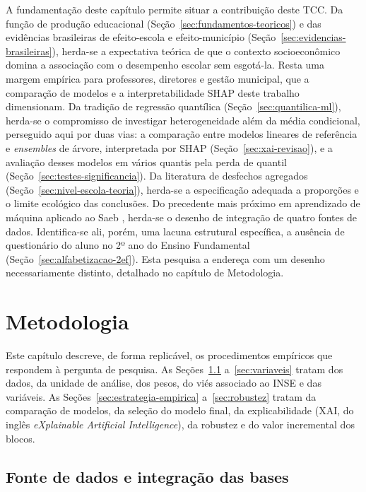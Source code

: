 A fundamentação deste capítulo permite situar a contribuição deste TCC. Da função de produção educacional
(Seção~\ref{sec:fundamentos-teoricos}) e das evidências brasileiras de
efeito-escola e efeito-município (Seção~\ref{sec:evidencias-brasileiras}),
herda-se a expectativa teórica de que o contexto socioeconômico domina a
associação com o desempenho escolar sem esgotá-la. Resta uma margem
empírica para professores, diretores e gestão municipal, que a comparação
de modelos e a interpretabilidade SHAP deste trabalho dimensionam. Da tradição de regressão quantílica
(Seção~\ref{sec:quantilica-ml}), herda-se o compromisso de investigar
heterogeneidade além da média condicional, perseguido aqui por duas vias:
a comparação entre modelos lineares de referência e \textit{ensembles} de
árvore, interpretada por SHAP (Seção~\ref{sec:xai-revisao}), e a avaliação
desses modelos em vários quantis pela perda de quantil
(Seção~\ref{sec:testes-significancia}). Da literatura de desfechos
agregados (Seção~\ref{sec:nivel-escola-teoria}), herda-se a especificação
adequada a proporções e o limite ecológico das conclusões. Do precedente
mais próximo em aprendizado de máquina aplicado ao Saeb
\cite{tertulino2025multilevel}, herda-se o desenho de integração de quatro
fontes de dados. Identifica-se ali, porém, uma lacuna estrutural
específica, a ausência de questionário do aluno no 2º ano do Ensino
Fundamental (Seção~\ref{sec:alfabetizacao-2ef}). Esta pesquisa a endereça
com um desenho necessariamente distinto, detalhado no capítulo de
Metodologia.

\chapter{Metodologia}

Este capítulo descreve, de forma replicável, os procedimentos empíricos
que respondem à pergunta de pesquisa. As Seções~\ref{sec:fonte-dados}
a~\ref{sec:variaveis} tratam dos dados, da unidade de análise, dos pesos,
do viés associado ao INSE e das variáveis. As
Seções~\ref{sec:estrategia-empirica} a~\ref{sec:robustez} tratam da
comparação de modelos, da seleção do modelo final, da explicabilidade (XAI,
do inglês \textit{eXplainable Artificial Intelligence}), da robustez e do
valor incremental dos blocos.

\section{Fonte de dados e integração das bases}
\label{sec:fonte-dados}

